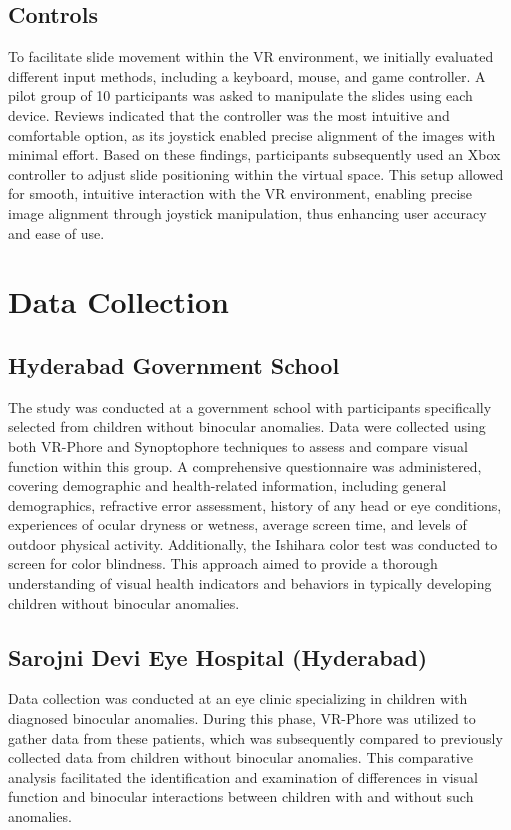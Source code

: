 \documentclass{article}
\begin{document}
\subsection{Controls}
To facilitate slide movement within the VR environment, we initially evaluated different input methods, including a keyboard, mouse, and game controller. A pilot group of 10 participants was asked to manipulate the slides using each device. Reviews indicated that the controller was the most intuitive and comfortable option, as its joystick enabled precise alignment of the images with minimal effort. Based on these findings, participants subsequently used an Xbox controller to adjust slide positioning within the virtual space. This setup allowed for smooth, intuitive interaction with the VR environment, enabling precise image alignment through joystick manipulation, thus enhancing user accuracy and ease of use.


\section{Data Collection}
\subsection{Hyderabad Government School}
The study was conducted at a government school with participants specifically selected from children without binocular anomalies. Data were collected using both VR-Phore and Synoptophore techniques to assess and compare visual function within this group. A comprehensive questionnaire was administered, covering demographic and health-related information, including general demographics, refractive error assessment, history of any head or eye conditions, experiences of ocular dryness or wetness, average screen time, and levels of outdoor physical activity. Additionally, the Ishihara color test was conducted to screen for color blindness. This approach aimed to provide a thorough understanding of visual health indicators and behaviors in typically developing children without binocular anomalies.


\subsection{Sarojni Devi Eye Hospital (Hyderabad)}
Data collection was conducted at an eye clinic specializing in children with diagnosed binocular anomalies. During this phase, VR-Phore was utilized to gather data from these patients, which was subsequently compared to previously collected data from children without binocular anomalies. This comparative analysis facilitated the identification and examination of differences in visual function and binocular interactions between children with and without such anomalies.
\end{document}

